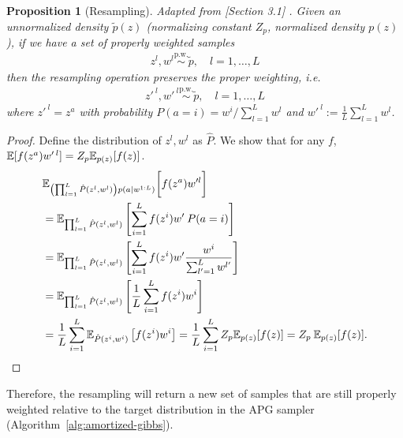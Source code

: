 \documentclass{article}
\newtheorem{proposition}{Proposition}
\theoremstyle{definition}
\newcommand{\pw}{\overset{\text{p.w.}}{\sim}
}
\begin{document}
\begin{proposition}[Resampling]
\label{proposition:resampling}
    Adapted from [Section 3.1] \cite{naesseth2015nested}.
    Given an unnormalized density $\tilde p(z)$ (normalizing constant $Z_p$, normalized density $p(z)$), if we have a set of properly weighted samples
    \begin{align}
        z^l, w^l \pw \tilde p,  \quad l = 1,\ldots, L \label{eq:bla}
    \end{align}
    then the resampling operation preserves the proper weighting, i.e.
    \begin{align*}
        z'^{\:l}, w'^{\:l} \pw \tilde p, \quad l = 1,\ldots, L
    \end{align*}
    where $z'^{\:l} = z^{a}$ with probability $P(a = i) = w^i / \sum_{l=1}^L w^l$ and $w'^{\:l} := \frac{1}{L} \sum_{l = 1}^L w^l$.
\end{proposition}
\begin{proof}
    Define the distribution of $z^l, w^l$ as $\hat{P}$.
    We show that for any $f$, $\mathbb{E}[f(z^{a}) w'^{\:l}] = Z_p \mathbb{E}_{p(z)}[f(z)]$.
    \begin{align*}
    &
        \mathbb{E}_{\left(\prod_{l=1}^L \hat{P}(z^l, w^l)\right) p(a \mid w^{1:L})} \bigg[f(z^{a}) w'^{l}\bigg] \\
        &= \mathbb{E}_{\prod_{l=1}^L \hat{P}(z^l, w^l)}\left[\sum_{i = 1}^L f(z^i) w' \: P(a = i)\right]  \\
        &= \mathbb{E}_{\prod_{l=1}^L \hat{P}(z^l, w^{l})}\left[\sum_{i = 1}^L f(z^i) w'  \frac{w^i}{ \sum_{l'=1}^L w^{l'}}\right]  \\
        &= \mathbb{E}_{\prod_{l=1}^L \hat{P}(z^l, w^l)}\left[\frac{1}{L}\sum_{i = 1}^L f(z^i) w^i\right] \\
        &= \frac{1}{L}\sum_{i = 1}^L \mathbb{E}_{\hat{P}(z^i, w^i)}\left[f(z^i) w^i\right]
        = \frac{1}{L}\sum_{i = 1}^L Z_p \mathbb{E}_{p(z)}[f(z)]
        = Z_p \: \mathbb{E}_{p(z)}[f(z)]. 
    \end{align*}
\end{proof}
Therefore, the resampling will return a new set of samples that are still properly weighted relative to the target distribution in the APG sampler (Algorithm~\ref{alg:amortized-gibbs}).
\end{document}
